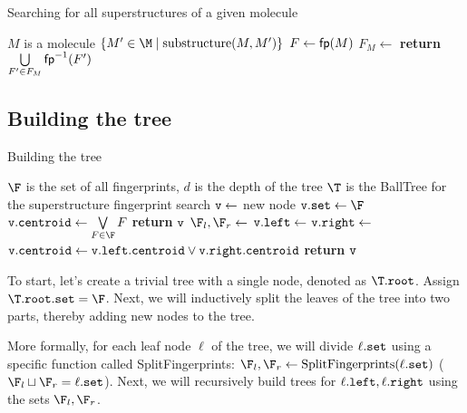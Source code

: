 \begin{algorithm}
  \caption{Searching for all superstructures of a given molecule} \label{alg:FindMetaStructures}
  \begin{algorithmic}[1]
    \Require $M $ is a molecule 
    \Ensure $\{M' \in \M \mid \mathrm{substructure}(M, M') \}$ 
    \State $F \gets {\sf fp}(M) $ 
    \State $F_M \gets $ 
    \State \textbf{return} $\bigcup\limits_{F' \in F_M} {\sf fp}^{-1}(F')$  
    \EndProcedure
  \end{algorithmic}
\end{algorithm}

\subsection{Building the tree}

\begin{algorithm}
  \caption{Building the tree} \label{alg:BuildTree}
  \begin{algorithmic}[1]
    \Require $\F$ is the set of all fingerprints, $d$ is the depth of the tree
    \Ensure $\T $ is the BallTree for the superstructure fingerprint search 
      \State ${\tt v} \gets$ new node
	\State ${\tt v.set} \gets \F$ 
	\State ${\tt v.centroid} \gets \bigvee\limits_{F \in \F} F$ 
	\State \textbf{return} ${\tt v}$ 
      \Else 
        \State $\F_l, \F_r \gets $ 
        \State ${\tt v.left} \gets $  
	\State ${\tt v.right} \gets $ 
	\State ${\tt v.centroid} \gets {\tt v.left.centroid} \lor {\tt v.right.centroid}$ 
        \State \textbf{return} ${\tt v}$ 
      \EndIf
    \EndProcedure
  \end{algorithmic}
\end{algorithm}

To start, let's create a trivial tree with a single node, denoted as $\T.{\tt root}$. Assign $\T.{\tt root.set} = \F$. 
Next, we will inductively split the leaves of the tree into two parts, thereby adding new nodes to the tree.

More formally, for each leaf node $\ell$ of the tree, we will divide $\ell.{\tt set}$ using a specific function 
called SplitFingerprints: $\F_l, \F_r \gets \text{SplitFingerprints}(\ell.{\tt set})$ ($\F_l \sqcup \F_r = \ell.{\tt set}$).
Next, we will recursively build trees for $\ell.{\tt left}, \ell.{\tt right}$ using the sets $\F_l, \F_r$.

